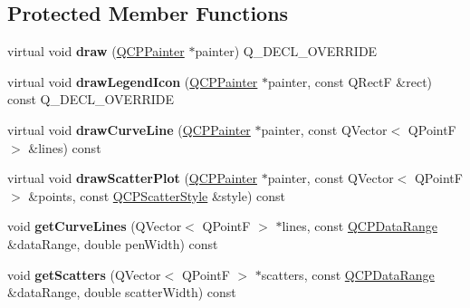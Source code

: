 \subsection*{Protected Member Functions}
\begin{DoxyCompactItemize}
\item 
\mbox{\label{class_q_c_p_curve_ac199d41d23865cd68bd7b598308a4433}} 
virtual void {\bfseries draw} (\hyperlink{class_q_c_p_painter}{Q\+C\+P\+Painter} $\ast$painter) Q\+\_\+\+D\+E\+C\+L\+\_\+\+O\+V\+E\+R\+R\+I\+DE
\item 
\mbox{\label{class_q_c_p_curve_aac6e94afbce4002d2cd7793250154e84}} 
virtual void {\bfseries draw\+Legend\+Icon} (\hyperlink{class_q_c_p_painter}{Q\+C\+P\+Painter} $\ast$painter, const Q\+RectF \&rect) const Q\+\_\+\+D\+E\+C\+L\+\_\+\+O\+V\+E\+R\+R\+I\+DE
\item 
\mbox{\label{class_q_c_p_curve_aa4d7415f7c69eb7820263941f7d88e2c}} 
virtual void {\bfseries draw\+Curve\+Line} (\hyperlink{class_q_c_p_painter}{Q\+C\+P\+Painter} $\ast$painter, const Q\+Vector$<$ Q\+PointF $>$ \&lines) const
\item 
\mbox{\label{class_q_c_p_curve_a0bea811373c5ee8c67c9c2b4d74ad866}} 
virtual void {\bfseries draw\+Scatter\+Plot} (\hyperlink{class_q_c_p_painter}{Q\+C\+P\+Painter} $\ast$painter, const Q\+Vector$<$ Q\+PointF $>$ \&points, const \hyperlink{class_q_c_p_scatter_style}{Q\+C\+P\+Scatter\+Style} \&style) const
\item 
\mbox{\label{class_q_c_p_curve_aefca1e5127fae2d7ff65b9e921637c58}} 
void {\bfseries get\+Curve\+Lines} (Q\+Vector$<$ Q\+PointF $>$ $\ast$lines, const \hyperlink{class_q_c_p_data_range}{Q\+C\+P\+Data\+Range} \&data\+Range, double pen\+Width) const
\item 
\mbox{\label{class_q_c_p_curve_a564c5fdc8409e3532b1322389a8434b8}} 
void {\bfseries get\+Scatters} (Q\+Vector$<$ Q\+PointF $>$ $\ast$scatters, const \hyperlink{class_q_c_p_data_range}{Q\+C\+P\+Data\+Range} \&data\+Range, double scatter\+Width) const
\item 
\mbox{\label{class_q_c_p_curve_a77c89253397c4754b40d4bc8d3e789bf}} 

\end{DoxyCompactItemize}
